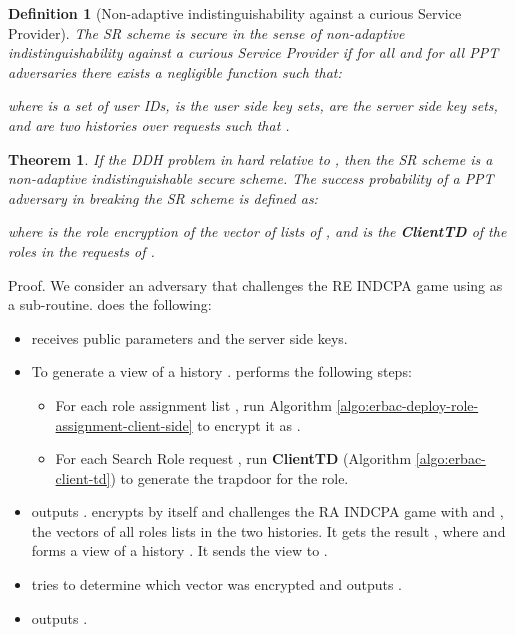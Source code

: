 \documentclass[epsfig,a4paper,11pt,titlepage]{book}
\newtheorem{definition}{Definition}
\newtheorem{theorem}{Theorem}
\numberwithin{algorithm}{chapter}
\begin{document}
\begin{definition}[Non-adaptive indistinguishability against a curious Service Provider]
The \gls{SR} scheme is secure in the sense of non-adaptive indistinguishability against a curious Service Provider if for all  and for all \gls{PPT} adversaries  there exists a negligible function  such that:

where  is a set of user IDs,  is the user side key sets,  are the server side key sets,  and  are two histories over  requests such that .
\end{definition}

\begin{theorem}\label{thm:3}
If the \gls{DDH} problem in hard relative to , then the \gls{SR} scheme is a non-adaptive indistinguishable secure scheme. The success probability of a \gls{PPT} adversary  in breaking the \gls{SR} scheme is defined as:

where  is the role encryption of the vector of lists of , and  is the \textbf{ClientTD} of the roles in the requests of .
\end{theorem}

Proof. We consider an adversary  that challenges the RE \gls{INDCPA} game using  as a sub-routine.  does the following:
\begin{itemize}
\item  receives public parameters  and the server side  keys. 

\item To generate a view of a history .  performs the following steps:
\begin{itemize}
\item For each role assignment list , run Algorithm \ref{algo:erbac-deploy-role-assignment-client-side} to encrypt it as . 
\item For each Search Role request , run \textbf{ClientTD} (Algorithm \ref{algo:erbac-client-td}) to generate the trapdoor  for the role.
\end{itemize}

\item  outputs .  encrypts  by itself and challenges the \gls{RA} \gls{INDCPA} game with  and , the vectors of all roles lists in the two histories. It gets the result , where  and forms a view of a history . It sends the view to .

\item  tries to determine which vector was encrypted and outputs .

\item  outputs .

\end{itemize}
\end{document}

